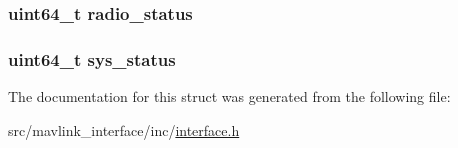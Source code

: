 \subsubsection[{\texorpdfstring{radio\+\_\+status}{radio_status}}]{\setlength{\rightskip}{0pt plus 5cm}uint64\+\_\+t radio\+\_\+status}\hypertarget{struct_time___stamps_a349d4b854b6448bec3938af7bb59a482}{}\label{struct_time___stamps_a349d4b854b6448bec3938af7bb59a482}
\subsubsection[{\texorpdfstring{sys\+\_\+status}{sys_status}}]{\setlength{\rightskip}{0pt plus 5cm}uint64\+\_\+t sys\+\_\+status}\hypertarget{struct_time___stamps_a0c435af1e679e794a97d29f6ad8033c4}{}\label{struct_time___stamps_a0c435af1e679e794a97d29f6ad8033c4}


The documentation for this struct was generated from the following file\+:\begin{DoxyCompactItemize}
\item 
src/mavlink\+\_\+interface/inc/\hyperlink{interface_8h}{interface.\+h}\end{DoxyCompactItemize}
